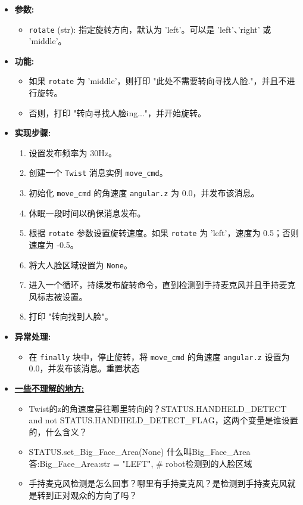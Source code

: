 \documentclass[]{article}
\begin{document}
\begin{itemize}
	\item \textbf{参数:}
	\begin{itemize}
		\item \texttt{rotate} (str): 指定旋转方向，默认为 'left'。可以是 'left'、'right' 或 'middle'。
	\end{itemize}
	\item \textbf{功能:}
	\begin{itemize}
		\item 如果 \texttt{rotate} 为 'middle'，则打印 "此处不需要转向寻找人脸."，并且不进行旋转。
		\item 否则，打印 "转向寻找人脸ing..."，并开始旋转。
	\end{itemize}
	\item \textbf{实现步骤:}
	\begin{enumerate}
		\item 设置发布频率为 30Hz。
		\item 创建一个 \texttt{Twist} 消息实例 \texttt{move\_cmd}。
		\item 初始化 \texttt{move\_cmd} 的角速度 \texttt{angular.z} 为 0.0，并发布该消息。
		\item 休眠一段时间以确保消息发布。
		\item 根据 \texttt{rotate} 参数设置旋转速度。如果 \texttt{rotate} 为 'left'，速度为 0.5；否则速度为 -0.5。
		\item 将大人脸区域设置为 \texttt{None}。
		\item 进入一个循环，持续发布旋转命令，直到检测到手持麦克风并且手持麦克风标志被设置。
		\item 打印 "转向找到人脸"。
	\end{enumerate}
	\item \textbf{异常处理:}
	\begin{itemize}
		\item 在 \texttt{finally} 块中，停止旋转，将 \texttt{move\_cmd} 的角速度 \texttt{angular.z} 设置为 0.0，并发布该消息。重置状态
	\end{itemize}
	\item \textbf{\underline{一些不理解的地方:}}
	\begin{itemize}
		\item Twist的z的角速度是往哪里转向的？STATUS.HANDHELD\_DETECT and not STATUS.HANDHELD\_DETECT\_FLAG，这两个变量是谁设置的，什么含义？
		\item 
		STATUS.set\_Big\_Face\_Area(None) 什么叫Big\_Face\_Area
		\\答:Big\_Face\_Area:str = "LEFT",                     \# robot检测到的人脸区域
		\item 手持麦克风检测是怎么回事？哪里有手持麦克风？是检测到手持麦克风就是转到正对观众的方向了吗？
	\end{itemize}
\end{itemize}
\end{document}
